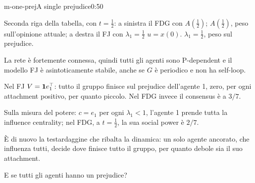 \begin{slide}{m-one-prej}{A single prejudice}{0:50}
  \begin{discorso}
    \item {\color{red}        } {\color{blue}Seconda riga della tabella, con $t=\tfrac12$:} a sinistra {\color{red}  } {\color{blue}il} FDG con {\color{red}$A(\tfrac12)$;} {\color{blue}$A(\tfrac12)$, peso sull'opinione attuale;} a destra {\color{red}    } {\color{blue}il} FJ con {\color{red}$\lambda_1=\tfrac12$} {\color{red}} {\color{red}$u=x(0)$.} {\color{blue}$\lambda_1=\tfrac12$, peso sul prejudice.}
    \item La rete è fortemente connessa, quindi tutti gli agenti sono P-dependent e il modello FJ è asintoticamente stabile, anche se $G$ è periodico e non ha self-loop.
    \item Nel FJ $V=\mathbf{1} e_1^\top$: tutto il gruppo finisce sul {\color{red}} {\color{blue}prejudice} dell'agente 1, zero, per ogni {\color{red}} {\color{blue}attachment} positivo, per quanto piccolo. Nel FDG invece il {\color{red}} {\color{blue}consensus} è a $3/7$.
    \item Sulla misura del potere: $c=e_1$ per ogni $\lambda_1<1$, l'agente 1 prende tutta la influence centrality; nel FDG, a $t=\tfrac12$, la sua social power è $2/7$.
    \item È di nuovo la testardaggine che ribalta la dinamica: un solo agente ancorato, che influenza tutti, decide dove finisce tutto il gruppo, per quanto debole sia il suo {\color{red}} {\color{blue}attachment.}
    \item E se tutti gli agenti hanno un {\color{red}} {\color{blue}prejudice?}
  \end{discorso}
\end{slide}

